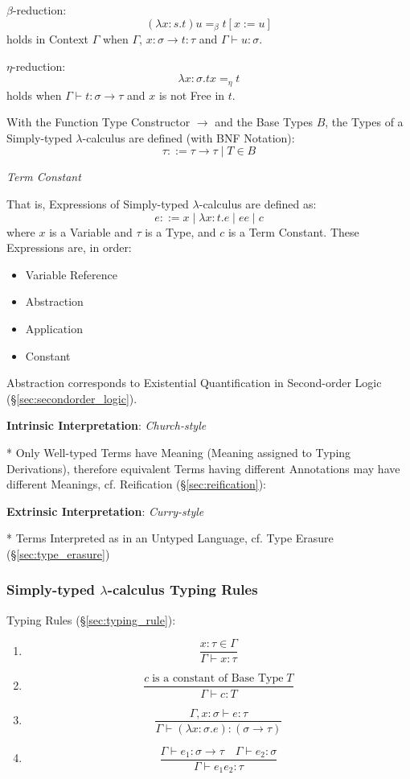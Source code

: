 $\beta$-reduction:
\[
  (\lambda x:s.t)u =_\beta t[x := u]
\]
holds in Context $\Gamma$ when $\Gamma$, $x:\sigma \rightarrow t:\tau$
and $\Gamma \vdash u:\sigma$.

$\eta$-reduction:
\[
  \lambda x:\sigma .t x =_\eta t
\]
holds when $\Gamma \vdash t : \sigma \rightarrow \tau$ and $x$ is not
Free in $t$.

With the Function Type Constructor $\rightarrow$ and the Base Types
$B$, the Types of a Simply-typed $\lambda$-calculus are defined (with
BNF Notation):
\[
  \tau ::= \tau \rightarrow \tau \;|\; T \in B
\]

\emph{Term Constant}

That is, Expressions of Simply-typed $\lambda$-calculus are defined
as:
\[
  e ::= x \;|\; \lambda x:t.e \;|\; e e \;|\; c
\]
where $x$ is a Variable and $\tau$ is a Type, and $c$ is a Term
Constant. These Expressions are, in order:
\begin{itemize}
  \item Variable Reference
  \item Abstraction
  \item Application
  \item Constant
\end{itemize}

Abstraction corresponds to Existential Quantification in Second-order
Logic (\S\ref{sec:secondorder_logic}).



\textbf{Intrinsic Interpretation}: \emph{Church-style}

* Only Well-typed Terms have Meaning (Meaning assigned to Typing
Derivations), therefore equivalent Terms having different Annotations
may have different Meanings, cf. Reification
(\S\ref{sec:reification}):



\textbf{Extrinsic Interpretation}: \emph{Curry-style}

* Terms Interpreted as in an Untyped Language, cf. Type Erasure
(\S\ref{sec:type_erasure})



\subsubsection{Simply-typed $\lambda$-calculus Typing Rules}
\label{sec:simplytyped_rules}

Typing Rules (\S\ref{sec:typing_rule}):
\begin{enumerate}
\item
  \[
    {
      \frac
      {x : \tau \in \Gamma}
      {\Gamma \vdash x : \tau}
    }
  \]
\item
  \[
    {
      \frac
      {c \;\text{is a constant of Base Type}\; T}
      {\Gamma \vdash c:T}
    }
  \]
\item
  \[
    {
      \frac
      {\Gamma, x:\sigma \vdash e:\tau}
      {\Gamma \vdash (\lambda x:\sigma.e):(\sigma \rightarrow \tau)}
    }
  \]
\item
  \[
    {
      \frac
      {\Gamma \vdash e_1:\sigma \rightarrow \tau \quad
        \Gamma \vdash e_2:\sigma}
      {\Gamma \vdash e_1 e_2 : \tau}
    }
  \]
\end{enumerate}



